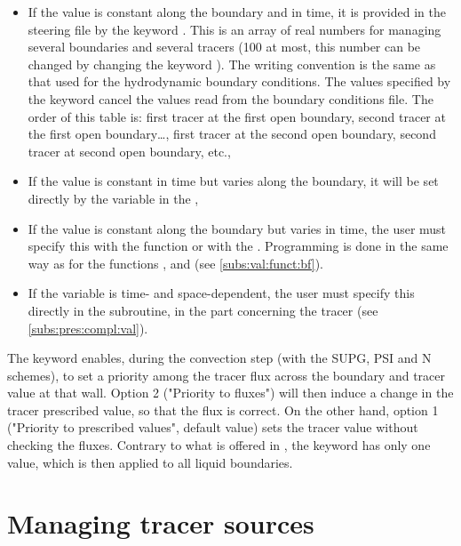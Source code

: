 \begin{itemize}
\item If the value is constant along the boundary and in time, it is provided
in the steering file by the keyword .
This is an array of real numbers for managing several boundaries and several
tracers (100 at most, this number can be changed by changing the keyword
).
The writing convention is the same as that used for the hydrodynamic boundary
conditions.
The values specified by the keyword cancel the values read from the boundary
conditions file.
The order of this table is: first tracer at the first open boundary,
second tracer at the first open boundary\ldots,
first tracer at the second open boundary,
second tracer at second open boundary, etc.,

\item If the value is constant in time but varies along the boundary,
it will be set directly by the  variable
in the ,

\item If the value is constant along the boundary but varies in time,
the user must specify this with the function  or with the
.
Programming is done in the same way as for the functions ,
 and  (see \ref{subs:val:funct:bf}).

\item If the variable is time- and space-dependent, the user must specify
this directly in the  subroutine,
in the part concerning the tracer (see \ref{subs:pres:compl:val}).
\end{itemize}

The keyword  enables,
during the convection step (with the SUPG, PSI and N schemes), to set a
priority among the tracer flux across the boundary and tracer value at that wall.
Option 2 ("Priority to fluxes") will then induce a change in the tracer
prescribed value, so that the flux is correct.
On the other hand, option 1 ("Priority to prescribed values", default value)
sets the tracer value without checking the fluxes.
Contrary to what is offered in , the  keyword has only
one value, which is then applied to all liquid boundaries.


\section{Managing tracer sources}


